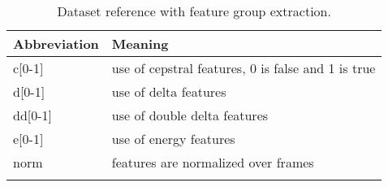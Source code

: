 \begin{table}[ht!]
\begin{center}
\caption{Dataset reference with feature group extraction.}
\begin{tabular}{ M{2cm} M{8cm} }
\toprule
\textbf{Abbreviation} & \textbf{Meaning}\\
\midrule
c[0-1] & use of cepstral features, 0 is false and 1 is true\\ 
d[0-1] & use of delta features\\ 
dd[0-1] & use of double delta features\\ 
e[0-1] & use of energy features\\
norm & features are normalized over frames\\
\bottomrule
\label{tab:feature_groups}
\end{tabular}
\end{center}
\end{table}
\FloatBarrier
\noindent
